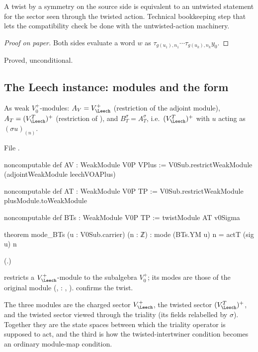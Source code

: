 \begin{physics}
A twist by a symmetry on the source side is equivalent to an untwisted statement for the sector seen through the twisted action. Technical bookkeeping step that lets the compatibility check be done with the untwisted-action machinery.
\end{physics}
\begin{proof}[Proof on paper]
Both sides evaluate a word $w$ as $\tau_{g(u_1),n_1}\cdots\tau_{g(u_k),n_k}y_0$.
\end{proof}
\begin{status}Proved, unconditional.\end{status}

\subsection{The Leech instance: modules and the form}

\begin{definition}\label{ch12:def:AVATBTs}
As weak $V_0^+$-modules: $A_V=V_\Leech^+$ (restriction of the adjoint module), $A_T=(V_\Leech^T)^+$
(restriction of ), and $B_{T}^{\sigma}=A_T^\sigma$, i.e.\ $(V_\Leech^T)^+$ with
$u$ acting as $(\sigma u)_{(n)}$.
\end{definition}
File .
\begin{leancode}
noncomputable def AV : WeakModule V0P VPlus := V0Sub.restrictWeakModule (adjointWeakModule leechVOAPlus)

noncomputable def AT : WeakModule V0P TP := V0Sub.restrictWeakModule plusModule.toWeakModule

noncomputable def BTs : WeakModule V0P TP := twistModule AT v0Sigma

theorem mode_BTs (u : V0Sub.carrier) (n : ℤ) : mode (BTs.YM u) n = actT (sig u) n
\end{leancode}
(.)
\begin{dictionary}
 restricts a $V_\Leech^+$-module to the subalgebra $V_0^+$; its modes
are those of the original module (, : , ).
 confirms the twist.
\end{dictionary}

\begin{physics}
The three modules are the charged sector $V_\Leech^+$, the twisted sector $(V_\Leech^T)^+$, and the twisted sector viewed through the triality (its fields relabelled by $\sigma$). Together they are the state spaces between which the triality operator is supposed to act, and the third is how the twisted-intertwiner condition becomes an ordinary module-map condition.
\end{physics}

